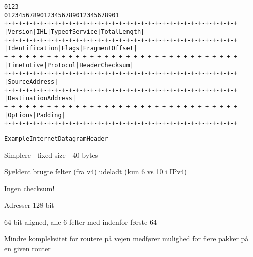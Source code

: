 \documentclass[Screen16to9,17pt]{foils}
\begin{document}
\begin{alltt}
\small
    0                   1                   2                   3
    0 1 2 3 4 5 6 7 8 9 0 1 2 3 4 5 6 7 8 9 0 1 2 3 4 5 6 7 8 9 0 1
   +-+-+-+-+-+-+-+-+-+-+-+-+-+-+-+-+-+-+-+-+-+-+-+-+-+-+-+-+-+-+-+-+
   |Version|  IHL  |Type of Service|          Total Length         |
   +-+-+-+-+-+-+-+-+-+-+-+-+-+-+-+-+-+-+-+-+-+-+-+-+-+-+-+-+-+-+-+-+
   |         Identification        |Flags|      Fragment Offset    |
   +-+-+-+-+-+-+-+-+-+-+-+-+-+-+-+-+-+-+-+-+-+-+-+-+-+-+-+-+-+-+-+-+
   |  Time to Live |    Protocol   |         Header Checksum       |
   +-+-+-+-+-+-+-+-+-+-+-+-+-+-+-+-+-+-+-+-+-+-+-+-+-+-+-+-+-+-+-+-+
   |                       Source Address                          |
   +-+-+-+-+-+-+-+-+-+-+-+-+-+-+-+-+-+-+-+-+-+-+-+-+-+-+-+-+-+-+-+-+
   |                    Destination Address                        |
   +-+-+-+-+-+-+-+-+-+-+-+-+-+-+-+-+-+-+-+-+-+-+-+-+-+-+-+-+-+-+-+-+
   |                    Options                    |    Padding    |
   +-+-+-+-+-+-+-+-+-+-+-+-+-+-+-+-+-+-+-+-+-+-+-+-+-+-+-+-+-+-+-+-+

                    Example Internet Datagram Header
\end{alltt}



\begin{list2}
\item Simplere - fixed size - 40 bytes
\item Sjældent brugte felter (fra v4) udeladt (kun 6 vs 10 i IPv4)
\item Ingen checksum!
\item Adresser 128-bit
\item 64-bit aligned, alle 6 felter med indenfor første 64
\end{list2}

Mindre kompleksitet for routere på vejen medfører
mulighed for flere pakker på en given router

\end{document}
